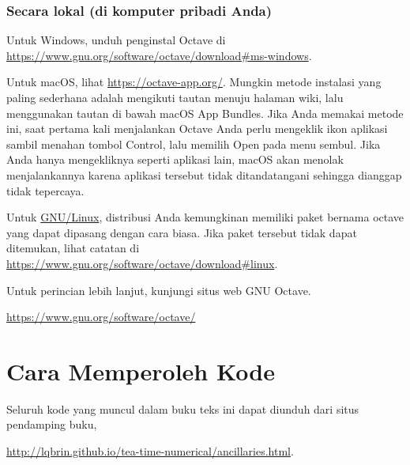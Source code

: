 \subsubsection*{Secara lokal (di komputer pribadi Anda)}

Untuk Windows, unduh penginstal Octave di \href{https://www.gnu.org/software/octave/download\#ms-windows}{https://www.gnu.org/software/octave/download\#ms-windows}.

\medskip{}

\noindent Untuk macOS, lihat \href{https://octave-app.org/}{https://octave-app.org/}.
Mungkin metode instalasi yang paling sederhana adalah mengikuti tautan
menuju halaman wiki, lalu menggunakan tautan di bawah macOS App Bundles.
Jika Anda memakai metode ini, saat pertama kali menjalankan Octave
Anda perlu mengeklik ikon aplikasi sambil menahan tombol Control,
lalu memilih Open pada menu sembul. Jika Anda hanya mengekliknya seperti
aplikasi lain, macOS akan menolak menjalankannya karena aplikasi tersebut
tidak ditandatangani sehingga dianggap tidak tepercaya.

\medskip{}

\noindent Untuk \href{https://www.gnu.org/gnu/linux-and-gnu.en.html}{GNU/Linux},
distribusi Anda kemungkinan memiliki paket bernama octave yang dapat
dipasang dengan cara biasa. Jika paket tersebut tidak dapat ditemukan,
lihat catatan di \href{https://www.gnu.org/software/octave/download\#linux}{https://www.gnu.org/software/octave/download\#linux}.

\medskip{}

\noindent Untuk perincian lebih lanjut, kunjungi situs web GNU Octave.
\begin{center}
\href{https://www.gnu.org/software/octave/}{https://www.gnu.org/software/octave/}
\par\end{center}

\section*{Cara Memperoleh Kode}


Seluruh kode yang muncul dalam buku teks ini dapat diunduh dari situs
pendamping buku,

\begin{center}
\url{http://lqbrin.github.io/tea-time-numerical/ancillaries.html}.
\par\end{center}

